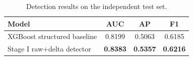 \begin{table}[t]
\caption{Detection results on the independent test set.}
\label{tab:detection}
\centering
\begin{tabular}{lccc}
\toprule
Model & AUC & AP & F1 \\
\midrule
XGBoost structured baseline & 0.8199 & 0.5063 & 0.6185 \\
Stage I raw+delta detector & \textbf{0.8383} & \textbf{0.5357} & \textbf{0.6216} \\
\bottomrule
\end{tabular}
\end{table}
